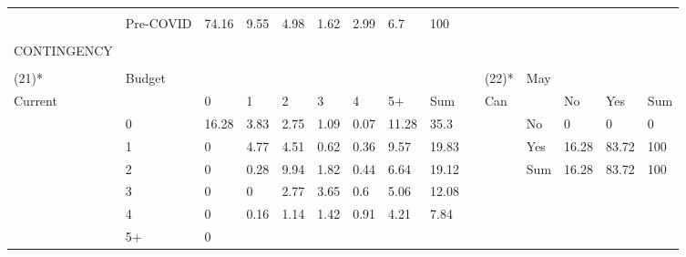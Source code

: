 \begin{center}
\begin{landscape}
\begin{longtable}{lllllllllllllll}
   &
   &
   &
   &
   &
    \\
 &
  Pre-COVID &
  \cellcolor[HTML]{A6A6A6}74.16 &
  \cellcolor[HTML]{F6F6F6}9.55 &
  \cellcolor[HTML]{FBFBFB}4.98 &
  \cellcolor[HTML]{FFFFFF}1.62 &
  \cellcolor[HTML]{FEFEFE}2.99 &
  \cellcolor[HTML]{F9F9F9}6.7 &
  100 &
   &
   &
   &
   &
   &
    \\
 &
    &
   &
   &
   &
   &
   &
   &
    &
   &
   &
   &
   &
   &
    \\
CONTINGENCY &
   &
   &
   &
   &
   &
   &
   &
    &
   &
   &
   &
   &
   &
    \\
 &
    &
   &
   &
   &
   &
   &
   &
    &
   &
   &
   &
   &
   &
    \\
(21)* &
  Budget &
   &
   &
   &
   &
   &
   &
    &
   &
  (22)* &
  May &
   &
   &
    \\
Current &
   &
  0 &
  1 &
  2 &
  3 &
  4 &
  5+ &
  Sum &
    &
  Can &
   &
  No &
  Yes &
  Sum \\
 &
  0 &
  \cellcolor[HTML]{A6A6A6}16.28 &
  \cellcolor[HTML]{EBEBEB}3.83 &
  \cellcolor[HTML]{F0F0F0}2.75 &
  \cellcolor[HTML]{FAFAFA}1.09 &
  \cellcolor[HTML]{FFFFFF}0.07 &
  \cellcolor[HTML]{C2C2C2}11.28 &
  35.3 &
   &
   &
  No &
  \cellcolor[HTML]{FFFFFF}0 &
  \cellcolor[HTML]{FFFFFF}0 &
  0 \\
 &
  1 &
  \cellcolor[HTML]{FFFFFF}0 &
  \cellcolor[HTML]{E5E5E5}4.77 &
  \cellcolor[HTML]{E7E7E7}4.51 &
  \cellcolor[HTML]{FCFCFC}0.62 &
  \cellcolor[HTML]{FEFEFE}0.36 &
  \cellcolor[HTML]{CBCBCB}9.57 &
  19.83 &
   &
   &
  Yes &
  \cellcolor[HTML]{EEEEEE}16.28 &
  \cellcolor[HTML]{A6A6A6}83.72 &
  100 \\
 &
  2 &
  \cellcolor[HTML]{FFFFFF}0 &
  \cellcolor[HTML]{FEFEFE}0.28 &
  \cellcolor[HTML]{C9C9C9}9.94 &
  \cellcolor[HTML]{F6F6F6}1.82 &
  \cellcolor[HTML]{FDFDFD}0.44 &
  \cellcolor[HTML]{DBDBDB}6.64 &
  19.12 &
   &
   &
  Sum &
  16.28 &
  83.72 &
  100 \\
 &
  3 &
  \cellcolor[HTML]{FFFFFF}0 &
  \cellcolor[HTML]{FFFFFF}0 &
  \cellcolor[HTML]{F0F0F0}2.77 &
  \cellcolor[HTML]{ECECEC}3.65 &
  \cellcolor[HTML]{FCFCFC}0.6 &
  \cellcolor[HTML]{E4E4E4}5.06 &
  12.08 &
   &
   &
   &
   &
   &
    \\
 &
  4 &
  \cellcolor[HTML]{FFFFFF}0 &
  \cellcolor[HTML]{FFFFFF}0.16 &
  \cellcolor[HTML]{F9F9F9}1.14 &
  \cellcolor[HTML]{F8F8F8}1.42 &
  \cellcolor[HTML]{FBFBFB}0.91 &
  \cellcolor[HTML]{E8E8E8}4.21 &
  7.84 &
   &
   &
   &
   &
   &
    \\
 &
  5+ &
  \cellcolor[HTML]{FFFFFF}0 &

\end{longtable}
\end{landscape}
\end{center}
